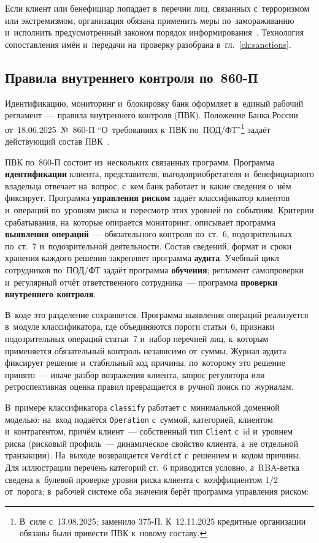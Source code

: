 Если клиент или бенефициар попадает в~перечни лиц, связанных с~терроризмом или
экстремизмом, организация обязана применить меры по~замораживанию и~исполнить
предусмотренный законом порядок информирования~\cite{fz-115}. Технология
сопоставления имён и~передачи на~проверку разобрана в~гл.~\ref{ch:sanctions}.

\subsection*{Правила внутреннего контроля по~860-П}

Идентификацию, мониторинг и~блокировку банк оформляет в~единый рабочий
регламент~--- правила внутреннего контроля (ПВК). Положение Банка России
от~18.06.2025~№~860-П \enquote{О~требованиях к~ПВК по~ПОД/ФТ}\footnote{В~силе
  с~13.08.2025; заменило 375-П. К~12.11.2025 кредитные организации обязаны были
привести ПВК к~новому составу.} задаёт действующий состав ПВК~\cite{cbr-860p}.

ПВК по~860-П состоит из~нескольких связанных программ. Программа
\textbf{идентификации} клиента, представителя, выгодоприобретателя
и~бенефициарного владельца отвечает на~вопрос, с~кем банк работает и~какие
сведения о~нём фиксирует. Программа \textbf{управления риском} задаёт классификатор
клиентов и~операций по~уровням риска и~пересмотр этих уровней по~событиям.
Критерии срабатывания, на~которые опирается мониторинг, описывает программа
\textbf{выявления операций}~--- обязательного контроля по~ст.~6, подозрительных
по~ст.~7 и~подозрительной деятельности. Состав сведений, формат и~сроки хранения
каждого решения закрепляет программа \textbf{аудита}. Учебный цикл сотрудников
по~ПОД/ФТ задаёт программа \textbf{обучения}; регламент самопроверки и~регулярный
отчёт ответственного сотрудника~--- программа \textbf{проверки внутреннего
контроля}.

В~коде это разделение сохраняется. Программа выявления операций реализуется
в~модуле классификатора, где объединяются пороги статьи~6, признаки подозрительных
операций статьи~7 и~набор перечней лиц, к~которым применяется обязательный
контроль независимо от~суммы. Журнал аудита фиксирует решение и~стабильный код
причины, по~которому это решение принято~--- иначе разбор возражения клиента,
запрос регулятора или ретроспективная оценка правил превращается в~ручной поиск
по~журналам.

В~примере классификатора \texttt{classify} работает с~минимальной доменной
моделью: на~вход подаётся \texttt{Operation} с~суммой, категорией,
клиентом и~контрагентом, причём клиент~--- собственный тип \texttt{Client} с~id
и~уровнем риска (рисковый профиль~--- динамическое свойство клиента, а~не
отдельной транзакции). На~выходе возвращается \texttt{Verdict} с~решением
и~кодом причины. Для иллюстрации перечень категорий ст.~6 приводится условно,
а~RBA-ветка сведена к~булевой проверке уровня риска клиента с~коэффициентом 1/2
от~порога; в~рабочей системе оба значения берёт программа управления риском:

